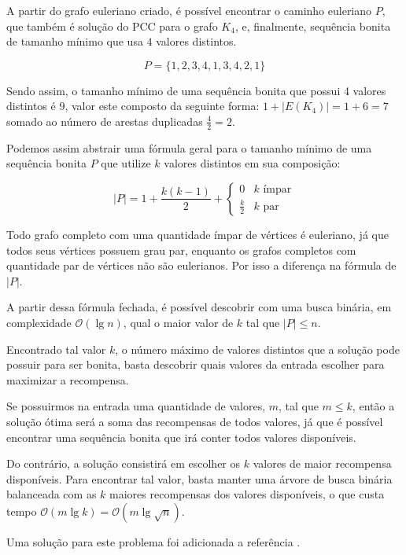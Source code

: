 \documentclass[12pt, a4paper]{article}
\begin{document}
        A partir do grafo euleriano criado, é possível encontrar o caminho euleriano $P$, que também é solução do PCC para o grafo $K_4$, e, finalmente, sequência bonita de tamanho mínimo que usa $4$ valores distintos.

        \[ P = \{1, 2, 3, 4, 1, 3, 4, 2, 1\} \]

        Sendo assim, o tamanho mínimo de uma sequência bonita que possui 4 valores distintos é $9$, valor este composto da seguinte forma: $1 + |E(K_4)| = 1 + 6 = 7$ somado ao número de arestas duplicadas $\frac{4}{2} = 2$.


        Podemos assim abstrair uma fórmula geral para o tamanho mínimo de uma sequência bonita $P$ que utilize $k$ valores distintos em sua composição:

        
        \[ |P|
             =  1 + \frac{k(k-1)}{2} + 
            \begin{cases} 
                0 & k \text{ ímpar} \\
                \frac{k}{2} & k \text{ par}
            \end{cases}
        \]

        Todo grafo completo com uma quantidade ímpar de vértices é euleriano, já que todos seus vértices possuem grau par, enquanto os grafos completos com quantidade par de vértices não são eulerianos. 
        Por isso a diferença na fórmula de $|P|$.

        A partir dessa fórmula fechada, é possível descobrir com uma busca binária, em complexidade $\mathcal{O}(\lg{n})$, qual o maior valor de $k$ tal que $|P| \leq n$.

        Encontrado tal valor $k$, o número máximo de valores distintos que a solução pode possuir para ser bonita, basta descobrir quais valores da entrada escolher para maximizar a recompensa.
        

        Se possuirmos na entrada uma quantidade de valores, $m$, tal que $m \leq k$, então a solução ótima será a soma das recompensas de todos valores, já que é possível encontrar uma sequência bonita que irá conter todos valores disponíveis.

        Do contrário, a solução consistirá em escolher os $k$ valores de maior recompensa disponíveis.
    Para encontrar tal valor, basta manter uma árvore de busca binária balanceada com as $k$ maiores recompensas dos valores disponíveis, o que custa tempo $\mathcal{O}(m\lg k) = \mathcal{O}(m\lg \sqrt{n})$.

    Uma solução para este problema foi adicionada a referência \cite{sereja-sol}. 
\end{document}
